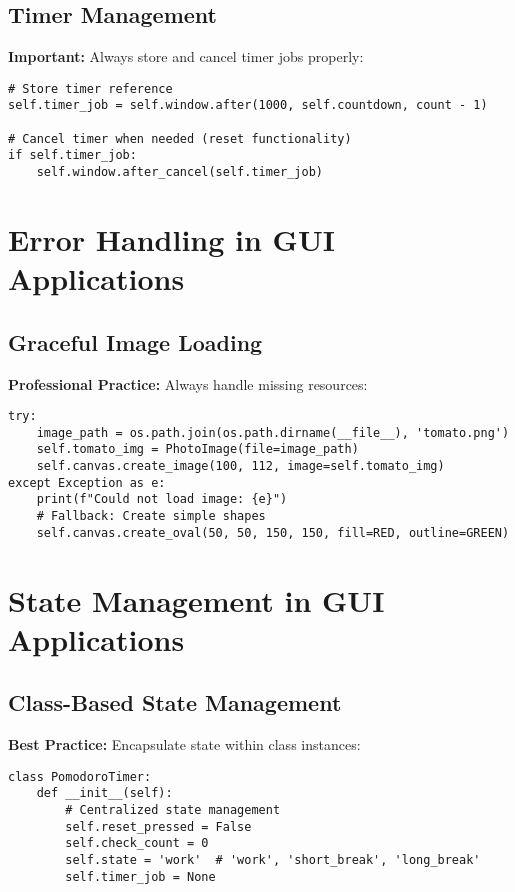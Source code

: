 \documentclass[12pt]{article}
\begin{document}
\subsection{Timer Management}
\textbf{Important:} Always store and cancel timer jobs properly:

\begin{lstlisting}
# Store timer reference
self.timer_job = self.window.after(1000, self.countdown, count - 1)

# Cancel timer when needed (reset functionality)
if self.timer_job:
    self.window.after_cancel(self.timer_job)
\end{lstlisting}

\section{Error Handling in GUI Applications}

\subsection{Graceful Image Loading}
\textbf{Professional Practice:} Always handle missing resources:

\begin{lstlisting}
try:
    image_path = os.path.join(os.path.dirname(__file__), 'tomato.png')
    self.tomato_img = PhotoImage(file=image_path)
    self.canvas.create_image(100, 112, image=self.tomato_img)
except Exception as e:
    print(f"Could not load image: {e}")
    # Fallback: Create simple shapes
    self.canvas.create_oval(50, 50, 150, 150, fill=RED, outline=GREEN)
\end{lstlisting}

\section{State Management in GUI Applications}

\subsection{Class-Based State Management}
\textbf{Best Practice:} Encapsulate state within class instances:

\begin{lstlisting}
class PomodoroTimer:
    def __init__(self):
        # Centralized state management
        self.reset_pressed = False
        self.check_count = 0
        self.state = 'work'  # 'work', 'short_break', 'long_break'
        self.timer_job = None
\end{lstlisting}
\end{document}
